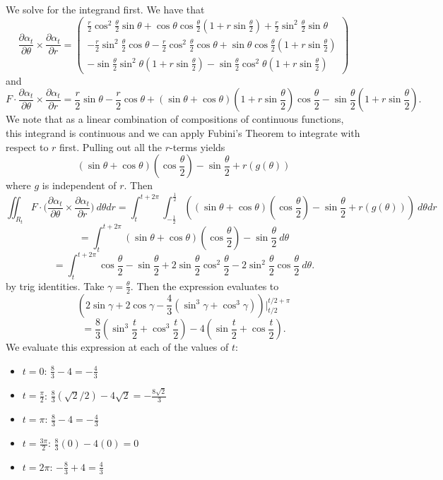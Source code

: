 \documentclass{amsart}
\begin{document}
\medskip \noindent We solve for the integrand first. We have that 
\[\frac{\partial\alpha_t}{\partial\theta}\times\frac{\partial\alpha_t}{\partial r}
=\begin{pmatrix}
    \frac{r}{2}\cos^2\frac{\theta}{2}\sin\theta+\cos\theta\cos\frac{\theta}{2}\left(1+r\sin\frac{\theta}{2}\right)+\frac{r}{2}\sin^2\frac{\theta}{2}\sin\theta\\
    -\frac{r}{2}\sin^2\frac{\theta}{2}\cos\theta-\frac{r}{2}\cos^2\frac{\theta}{2}\cos\theta+\sin\theta\cos\frac{\theta}{2}(1+r\sin\frac{\theta}{2})\\
    -\sin\frac{\theta}{2}\sin^2\theta(1+r\sin\frac{\theta}{2})-\sin\frac{\theta}{2}\cos^2\theta(1+r\sin\frac{\theta}{2})
\end{pmatrix}\]
and \[F\cdot \frac{\partial\alpha_t}{\partial\theta}\times\frac{\partial\alpha_t}{\partial r} =
\frac{r}{2}\sin\theta-\frac{r}{2}\cos\theta+(\sin\theta+\cos\theta)\left(1+r\sin\frac{\theta}{2}\right)\cos\frac{\theta}{2}-\sin\frac{\theta}{2}\left(1+r\sin\frac{\theta}{2}\right).\]
We note that as a linear combination of compositions of continuous functions, this integrand is continuous and we can apply Fubini's Theorem to integrate
with respect to $r$ first. Pulling out all the $r$-terms yields 
\[(\sin\theta+\cos\theta)\left(\cos\frac{\theta}{2}\right)-\sin\frac{\theta}{2}+r(g(\theta))\] where $g$ is independent of $r$. Then
\[\iint_{R_t}F\cdot\bigg(\frac{\partial\alpha_t}{\partial\theta}\times\frac{\partial\alpha_t}{\partial r}\bigg)\:d\theta dr
= \int_{t}^{t+2\pi}\int_{-\frac{1}{2}}^{\frac{1}{2}}\left((\sin\theta+\cos\theta)\left(\cos\frac{\theta}{2}\right)-\sin\frac{\theta}{2}+r(g(\theta))\right)\:d\theta dr\]
\[=\int_{t}^{t+2\pi}(\sin\theta+\cos\theta)\left(\cos\frac{\theta}{2}\right)-\sin\frac{\theta}{2}\: d\theta\]
\[=\int_{t}^{t+2\pi}\cos\frac{\theta}{2}-\sin\frac{\theta}{2}+2\sin\frac{\theta}{2}\cos^2\frac{\theta}{2}-2\sin^2\frac{\theta}{2}\cos\frac{\theta}{2}\:d\theta.\]
by trig identities. Take $\gamma=\frac{\theta}{2}$. Then the expression evaluates to 
\[\left(2\sin\gamma+2\cos\gamma-\frac{4}{3}(\sin^3\gamma+\cos^3\gamma)\right)\Big|^{t/2+\pi}_{t/2}\]
\[=\frac{8}{3}\left(\sin^3\frac{t}{2}+\cos^3\frac{t}{2}\right)-4\left(\sin\frac{t}{2}+\cos\frac{t}{2}\right).\]
We evaluate this expression at each of the values of $t$: 
\begin{itemize}
    \item $t=0$: $\frac{8}{3}-4=-\frac{4}{3}$
    \item $t=\frac{\pi}{2}$: $\frac{8}{3}(\sqrt{2}/2)-4\sqrt{2}=-\frac{8\sqrt{2}}{3}$
    \item $t=\pi$: $\frac{8}{3}-4=-\frac{4}{3}$
    \item $t=\frac{3\pi}{2}$: $\frac{8}{3}(0)-4(0)=0$
    \item $t=2\pi$: $-\frac{8}{3}+4=\frac{4}{3}$
\end{itemize}
\end{document}
